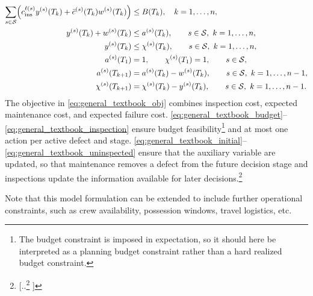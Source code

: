 \documentclass{article}
\providecommand{\DIFadd}[1]{{\protect\color{blue} \sf #1}} %
\providecommand{\DIFdel}[1]{{\protect\color{red} [..\footnote{removed: #1} ]}} %
\providecommand{\DIFaddbegin}{} %
\providecommand{\DIFaddend}{} %
\providecommand{\DIFdelbegin}{} %
\providecommand{\DIFdelend}{} %
\begin{document}
\DIFdelend \DIFaddbegin \begin{align}
\sum_{s\in\mathcal S}
\Bigl(
c^{\ell(s)}_{\mathrm{ins}} y^{(s)} (T_k)
+ \bar c^{(s)}(T_k) w^{(s)}(T_k)
\Bigr)
&\le B(T_k),\quad k = 1,\dots,n,
\label{eq:general_textbook_budget}\\
y^{(s)}(T_k)+w^{(s)}(T_k)
&\le a^{(s)}(T_k),\qquad s\in\mathcal S,\  k = 1,\dots,n,
\label{eq:general_textbook_exclusive}\\
y^{(s)}(T_k)
&\le \chi^{(s)}(T_k),\qquad s\in\mathcal S,\  k = 1,\dots,n,
\label{eq:general_textbook_inspection}\\
a^{(s)}(T_1)&=1,\qquad \chi^{(s)}(T_1)=1, \qquad s\in\mathcal S,
\label{eq:general_textbook_initial}\\
a^{(s)}(T_{k+1})&=a^{(s)}(T_k)-w^{(s)}(T_k),\qquad s\in\mathcal S,\ k=1,\dots,n-1,
\label{eq:general_textbook_activity}\\
\chi^{(s)}(T_{k+1})&=\chi^{(s)}(T_k)-y^{(s)}(T_k),\qquad s\in\mathcal S,\ k=1,\dots,n-1.
\label{eq:general_textbook_uninspected}
\end{align}\DIFaddend 
The objective in \cref{eq:general_textbook_obj} combines inspection cost, expected maintenance cost, and expected failure cost. 
\cref{eq:general_textbook_budget}--\cref{eq:general_textbook_inspection} ensure budget feasibility\DIFaddbegin \footnote{\DIFadd{The budget constraint is imposed in expectation, so it should here be interpreted as a planning budget constraint rather than a hard realized budget constraint.}} \DIFaddend and at most one action per active defect and stage.
\cref{eq:general_textbook_initial}--\cref{eq:general_textbook_uninspected} ensure that the auxiliary variable are updated, so that maintenance removes a defect from the future decision stage and inspections update the information available for later decisions.\DIFdelbegin \footnote{\DIFdel{If an event has probability 1, then we say that this event occurs ``almost surely'' (a.s.) \citep[Chapter 3]{thygesen2023a}.}}
\addtocounter{footnote}{-1}%
\DIFdelend %
\DIFaddbegin \DIFadd{Note that this model formulation can be extended to include further operational constraints, such as crew availability, possession windows, travel logistics, etc.
}\DIFaddend 
\end{document}
